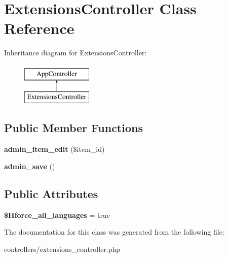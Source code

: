 \hypertarget{class_extensions_controller}{
\section{\-Extensions\-Controller \-Class \-Reference}
\label{class_extensions_controller}
}
\-Inheritance diagram for \-Extensions\-Controller\-:\begin{figure}[H]
\begin{center}
\leavevmode
\includegraphics[height=2.000000cm]{class_extensions_controller}
\end{center}
\end{figure}
\subsection*{\-Public \-Member \-Functions}
\begin{DoxyCompactItemize}
\item 
\hypertarget{class_extensions_controller_a98aa8b34bdd47dfdf2f6e870855144ed}{
{\bfseries admin\-\_\-item\-\_\-edit} (\$item\-\_\-id)}
\label{class_extensions_controller_a98aa8b34bdd47dfdf2f6e870855144ed}

\item 
\hypertarget{class_extensions_controller_afdc9fac96cc8f1ed9d87522d864d7192}{
{\bfseries admin\-\_\-save} ()}
\label{class_extensions_controller_afdc9fac96cc8f1ed9d87522d864d7192}

\end{DoxyCompactItemize}
\subsection*{\-Public \-Attributes}
\begin{DoxyCompactItemize}
\item 
\hypertarget{class_extensions_controller_a712818edbce6b10da19a374b7db46624}{
{\bfseries \$\-Hforce\-\_\-all\-\_\-languages} = true}
\label{class_extensions_controller_a712818edbce6b10da19a374b7db46624}

\end{DoxyCompactItemize}


\-The documentation for this class was generated from the following file\-:\begin{DoxyCompactItemize}
\item 
controllers/extensions\-\_\-controller.\-php\end{DoxyCompactItemize}
